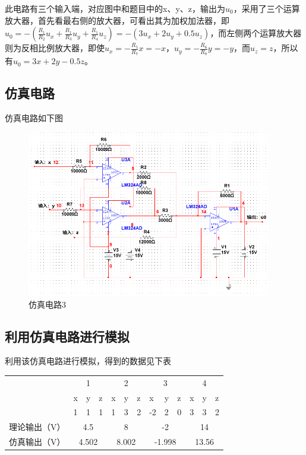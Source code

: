 \documentclass[UTF8]{ctexart}
\begin{document}
此电路有三个输入端，对应图中和题目中的x、y、z，输出为$u_0$，采用了三个运算放大器，首先看最右侧的放大器，可看出其为加权加法器，即$u_0=-(\frac{R_1}{R_2}u_x+\frac{R_1}{R_3}u_y+\frac{R_1}{R_4}u_z)=-(3u_x+2u_y+0.5u_z)$，而左侧两个运算放大器则为反相比例放大器，即使$u_x=-\frac{R_5}{R_7}x=-x$，$u_y=-\frac{R_6}{R_8}y=-y$，而$u_z=z$，所以有$u_0=3x+2y-0.5z$。
\subsection{仿真电路}
仿真电路如下图
\begin{figure}[H]
\centering
\includegraphics[width=0.95\textwidth]{E.png}
\caption{仿真电路3}
\end{figure}
\subsection{利用仿真电路进行模拟}
利用该仿真电路进行模拟，得到的数据见下表
\begin{table}[H]
    \centering
    \begin{tabular}{|l|l|l|l|l|l|l|l|l|l|l|l|l|}
    \hline
\multirow{3}{*}{ }
&\multicolumn{3}{|c|}{1} &\multicolumn{3}{|c|}{2} &\multicolumn{3}{|c|}{3} &\multicolumn{3}{|c|}{4}  \\ \cline{2-13}
         & x & y & z & x & y & z & x & y & z & x & y & z \\ \cline{2-13}
         & 1 & 1 & 1 & 1 & 3 & 2 & -2 & 2 & 0 & 3 & 3 & 2 \\ \hline
        理论输出（V） &\multicolumn{3}{|c|}{4.5}&\multicolumn{3}{|c|}{8}&\multicolumn{3}{|c|}{-2}&\multicolumn{3}{|c|}{14} \\ \hline
        仿真输出（V） &\multicolumn{3}{|c|}{4.502}&\multicolumn{3}{|c|}{8.002}&\multicolumn{3}{|c|}{-1.998}&\multicolumn{3}{|c|}{13.56} \\ \hline
    \end{tabular}
\end{table}
\end{document}
